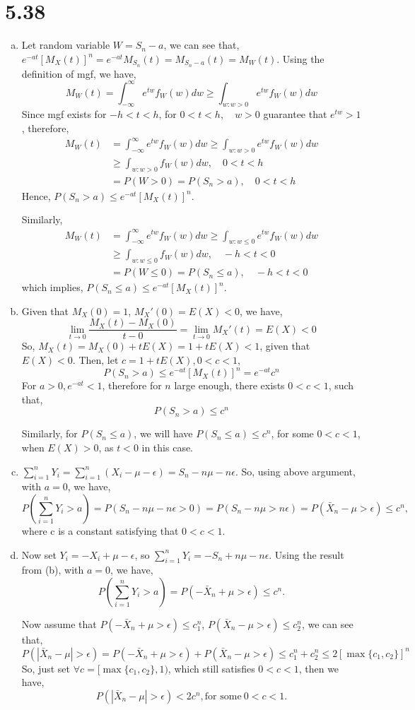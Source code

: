 \documentclass[letterpaper]{article}
\newcommand{\intii}{\int_{-\infty}^\infty}
\begin{document}
\section*{5.38}
\begin{enumerate}[(a)]
\item Let random variable $W = S_n - a$, we can see that, $e^{-at}[M_X(t)]^n = e^{-at}M_{S_n}(t) = M_{S_n - a}(t) = M_W(t)$. Using the definition of mgf, we have,
\[
M_W(t) = \intii e^{tw} f_W(w) dw \ge \int_{w: w >0} e^{tw} f_W(w) dw
\]
Since mgf exists for $-h < t < h$, for $0 < t < h, \quad w > 0$ guarantee that $e^{tw} > 1$, therefore,
\begin{align*}
M_W(t) & = \intii e^{tw} f_W(w) dw \ge \int_{w: w >0} e^{tw} f_W(w) dw \\
 & \ge \int_{w: w>0} f_W(w) dw, \quad 0 < t < h \\
 & = P(W > 0) = P(S_n > a), \quad 0 < t < h
\end{align*}
Hence, $P(S_n > a) \le e^{-at}[M_X(t)]^n$.

Similarly,
\begin{align*}
M_W(t) & = \intii e^{tw} f_W(w) dw \ge \int_{w: w \le 0} e^{tw} f_W(w) dw \\
 & \ge \int_{w: w \le 0} f_W(w) dw, \quad -h < t < 0 \\
 & = P(W \le 0) = P(S_n \le a), \quad -h < t < 0
\end{align*}
which implies, $P(S_n \le a) \le e^{-at}[M_X(t)]^n$.
\item 
Given that $M_X(0) = 1$, $M_X'(0) = E(X) < 0$, we have,
\[
\lim_{t\to 0}\frac{M_X(t) - M_X(0)}{t-0} = \lim_{t \to 0}M_X'(t) = E(X) < 0
\]
So, $M_X(t) = M_X(0) + tE(X) = 1 + tE(X) < 1$, given that $E(X) < 0$. 
Then, let $c = 1 + tE(X), 0 < c < 1$, 
\[
P(S_n > a) \le e^{-at}[M_X(t)]^n = e^{-at}c^n
\]
For $a > 0, e^{-at} < 1$, therefore for $n$ large enough, there exists $0 < c<1$, such that,
\[
P(S_n > a) \le c^n
\]

Similarly, for $P(S_n \le a)$, we will have $P(S_n \le a) \le c^n$, for some $0 < c <1$, when $E(X) > 0$, as $t < 0$ in this case.

\item $\sum_{i=1}^n Y_i = \sum_{i=1}^n (X_i - \mu - \epsilon) = S_n - n\mu - n\epsilon$. So, using above argument, with $a = 0$, we have,
\[
P(\sum_{i=1}^n Y_i > a) = P(S_n - n\mu - n\epsilon > 0) = P(S_n - n\mu > n\epsilon) = P(\bar X_n - \mu > \epsilon) \le c^n,
\]
where c is a constant satisfying that $0<c<1$.
\item Now set $Y_i = -X_i + \mu - \epsilon$, so $\sum_{i=1}^n Y_i = -S_n + n\mu - n\epsilon$. Using the result from (b), with $a = 0$, we have,
\[
P(\sum_{i=1}^n Y_i > a) = P(-\bar X_n + \mu > \epsilon) \le c^n.
\]

Now assume that $P(-\bar X_n + \mu > \epsilon) \le c_1^n$, $P(\bar X_n - \mu > \epsilon) \le c_2^n$, we can see that,
\[
P(|\bar X_n - \mu| > \epsilon) = P(-\bar X_n + \mu > \epsilon) + P(\bar X_n - \mu > \epsilon) \le c_1^n + c_2^n \le 2 [\max\{c_1, c_2\}]^n
\]
So, just set $\forall c = [\max\{c_1, c_2\}, 1)$, which still satisfies $0 < c < 1$, then we have,
\[
P(|\bar X_n - \mu| > \epsilon) < 2c^n, \text{for some}~0 < c < 1.
\]

\end{enumerate}
\end{document}
